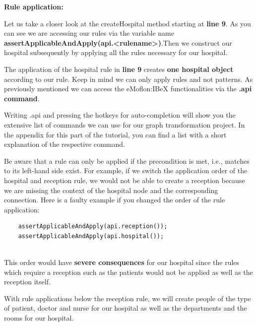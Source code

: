 {\textbf{Rule application:}

Let us take a closer look at the \textsf{createHospital} method starting at \textbf{line 9}.\newline
As you can see we are accessing our rules via the variable name \textbf{assertApplicableAndApply(api.<rulename>)}.\newline Then we construct our hospital subsequently by applying all the rules necessary for our hospital.\newline

The application of the hospital rule in \textbf{line 9} creates \textbf{one hospital object} according to our rule. Keep in mind we can only apply rules and not patterns. As previously mentioned we can access the eMoflon:IBeX functionalities via the \textbf{.api command}.\newline

Writing \textsf{.api} and pressing the hotkeys for auto-completion will show you the extensive list of commands we can use for our graph transformation project. In the appendix for this part of the tutorial, you can find a list with a short explanation of the respective command.\newline

Be aware that a rule can only be applied if the precondition is met, i.e., matches to its left-hand side exist.\newline
For example, if we switch the application order of the hospital and reception rule, we would not be able to create a reception because we are missing the context of the hospital node and the corresponding connection.\newline
Here is a faulty example if you changed the order of the rule application:\newline
\clearpage

\begin{lstlisting}	
	assertApplicableAndApply(api.reception());
	assertApplicableAndApply(api.hospital());
			
\end{lstlisting}

This order would have \textbf{severe consequences} for our hospital since the rules which require a reception such as the patients would not be applied as well as the reception itself. \newline

With rule applications below the reception rule, we will create people of the type of patient, doctor and nurse for our hospital as well as the departments and the rooms for our hospital.\newline

}
